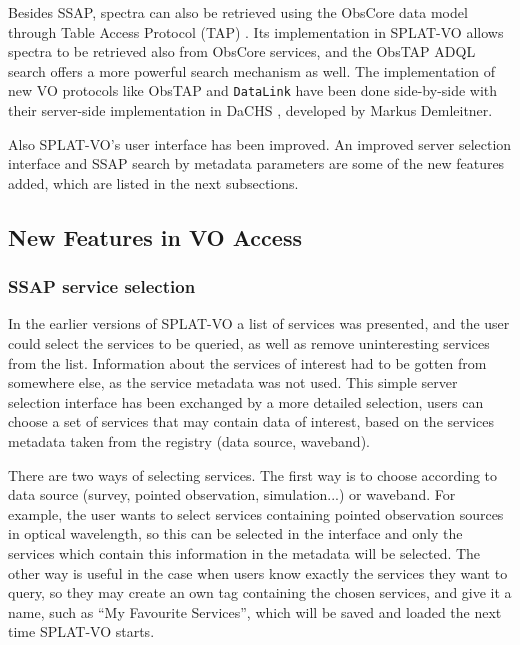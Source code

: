 \documentclass[final,authoryear,5p,times,twocolumn]{elsarticle}
\begin{document}
Besides SSAP, spectra can also be retrieved using the ObsCore data model
through Table Access Protocol (TAP)  \citep[known as ObsTap;][]{obstap}. Its implementation in
SPLAT-VO allows spectra to be retrieved also from ObsCore services, and
the ObsTAP ADQL \citep{adql} search offers a more powerful search
mechanism as well. The implementation of new VO protocols like ObsTAP
and \texttt{DataLink} have been done side-by-side with their server-side
implementation in DaCHS \citep[Data Center Helper Suite;][]{dachs},
developed by Markus Demleitner.

Also SPLAT-VO's user interface has been improved. An improved server
selection interface and SSAP search by metadata parameters are some of
the new features added, which are listed in the next subsections.

\subsection{New Features in VO Access}

\subsubsection{SSAP service selection}

In the earlier versions of SPLAT-VO a list of services was presented, and
the user could select the services to be queried, as well as remove
uninteresting services from the list. Information about the services
of interest had to be gotten from somewhere else, as the service
metadata was not used.  This simple server selection interface has
been exchanged by a more detailed selection, users can choose a set of
services that may contain data of interest, based on the services
metadata taken from the registry (data source, waveband).

There are two ways of selecting services. The first way is to choose
according to data source (survey, pointed observation, simulation...)
or waveband.  For example, the user wants to select services
containing pointed observation sources in optical wavelength, so this
can be selected in the interface and only the services which contain
this information in the metadata will be selected.  The other way is
useful in the case when users know exactly the services they want to
query, so they may create an own tag containing the chosen services,
and give it a name, such as ``My Favourite Services'', which will be saved
and loaded the next time SPLAT-VO starts.
\end{document}

